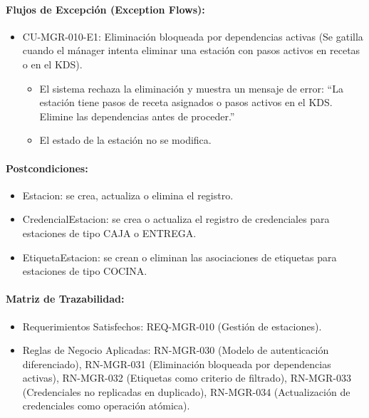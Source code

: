 \paragraph{Flujos de Excepción (Exception Flows):}
\begin{itemize}
    \item CU-MGR-010-E1: Eliminación bloqueada por dependencias activas (Se gatilla cuando el mánager intenta eliminar una estación con pasos activos en recetas o en el KDS).
    \begin{itemize}
        \item El sistema rechaza la eliminación y muestra un mensaje de error: ``La estación tiene pasos de receta asignados o pasos activos en el KDS. Elimine las dependencias antes de proceder.''
        \item El estado de la estación no se modifica.
    \end{itemize}
\end{itemize}

\paragraph{Postcondiciones:}
\begin{itemize}
    \item Estacion: se crea, actualiza o elimina el registro.
    \item CredencialEstacion: se crea o actualiza el registro de credenciales para estaciones de tipo CAJA o ENTREGA.
    \item EtiquetaEstacion: se crean o eliminan las asociaciones de etiquetas para estaciones de tipo COCINA.
\end{itemize}

\paragraph{Matriz de Trazabilidad:}
\begin{itemize}
    \item Requerimientos Satisfechos: REQ-MGR-010 (Gestión de estaciones).
    \item Reglas de Negocio Aplicadas: RN-MGR-030 (Modelo de autenticación diferenciado), RN-MGR-031 (Eliminación bloqueada por dependencias activas), RN-MGR-032 (Etiquetas como criterio de filtrado), RN-MGR-033 (Credenciales no replicadas en duplicado), RN-MGR-034 (Actualización de credenciales como operación atómica).
\end{itemize}